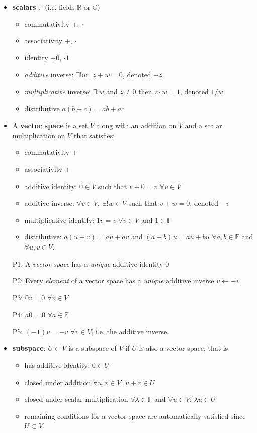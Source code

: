 \documentclass[11pt,notitlepage,oneside]{article}
\begin{document}
\begin{itemize}
\item \textbf{scalars} $\mathbb{F}$ (i.e. fields $\mathbb{R}$ or $\mathbb{C}$)
\begin{itemize}
\item commutativity +, $\cdot$
\item associativity +, $\cdot$
\item identity +0, $\cdot 1$
\item \emph{additive} inverse: $\exists!w \mid z + w = 0$, denoted $-z$
\item \emph{multiplicative} inverse: $\exists!w$ and $z\neq0$ then $z\cdot w = 1$, denoted $1/w$
\item distributive $a(b+c) = ab+ac$
\end{itemize}
\item A \textbf{vector space} is a set $V$ along with an addition on $V$ and a scalar multiplication on $V$ that satisfies:
\begin{itemize}
\item commutativity +
\item associativity +
\item additive identity: $0\in V$ such that $v+0=v$ $\forall v\in V$
\item additive inverse: $\forall v\in V,\; \exists!w\in V$ such that $v+w=0$, denoted $-v$
\item multiplicative identify: $1v=v\;\forall v\in V$ and $1\in\mathbb{F}$
\item distributive: $a(u+v)=au+av$ and $(a+b)u=au+bu$ $\forall a,b\in\mathbb{F}$ and $\forall u,v \in V$.
\end{itemize}
 
\item[P1:\label{it:P1_1}] A \emph{vector space} has a \emph{unique} additive identity $0$
\item[P2:\label{it:P1_2}] Every \emph{element} of a vector space has a \emph{unique} additive inverse $v\leftarrow -v$
\item[P3:] $0v=0$ $\forall v\in V$
\item[P4:] $a0=0$ $\forall a\in \mathbb{F}$
\item[P5:] $(-1)v = -v$ $\forall v\in V$, i.e. the additive inverse

\item \textbf{subspace}: $U\subset V$ is a subspace of $V$ if $U$ is also a vector space, that is
\begin{itemize}
\item has additive identity: $0\in U$
\item closed under addition $\forall u,v \in V$: $u+v \in U$ 
\item closed under scalar multiplication $\forall \lambda\in \mathbb{F}$ and $\forall u \in V$: $\lambda u \in U$  
\item remaining conditions for a vector space are automatically satisfied since $U\subset V$.
\end{itemize} 


\end{itemize}
\end{document}
